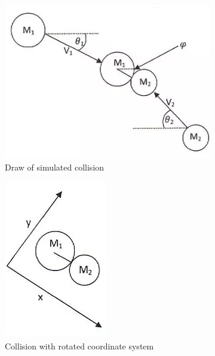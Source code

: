\documentclass[]{report}
\begin{document}
\begin{figure}[h]
\begin{subfigure}{.5\textwidth}
	\centering
	\includegraphics[height=0.8\linewidth]{collision}
	\caption{Draw of simulated collision}
	\label{fig:collision}
\end{subfigure}
\begin{subfigure}{.5\textwidth}
	\centering
	\includegraphics[height=0.8\linewidth]{collision_rotated}
	\caption{Collision with rotated coordinate system}
	\label{fig:collison_rotated}
\end{subfigure}
\caption{}
\end{figure}
\end{document}
